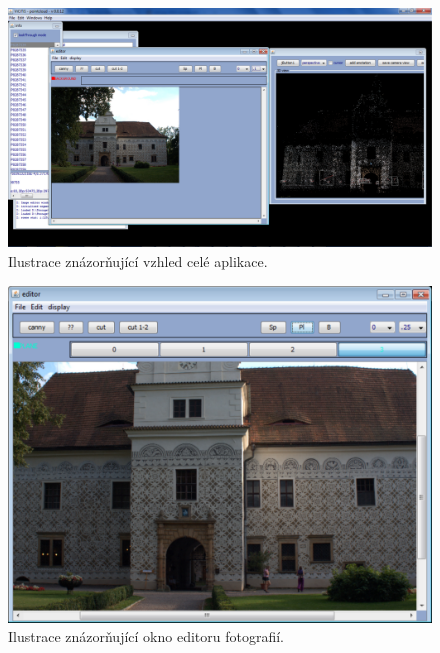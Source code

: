 \documentclass[11pt,twoside,a4paper]{book}
\begin{document}
\begin{figure}[h]
	\begin{center}
		\includegraphics[width=15cm]{ilustrace/Il-1-1}
		\caption{Ilustrace znázorňující vzhled celé aplikace.}
		\label{fig:1-1}
	\end{center}
\end{figure}

\begin{figure}[]
	\begin{center}
		\includegraphics[width=14cm]{ilustrace/Il-1-2}
		\caption{Ilustrace znázorňující okno editoru fotografií.}
		\label{fig:1-2}
	\end{center}
\end{figure}
\end{document}
